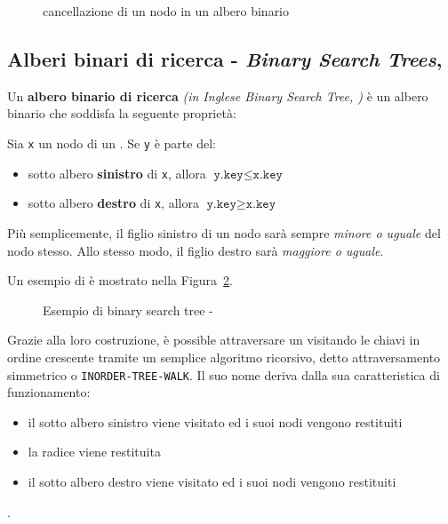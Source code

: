 \documentclass[italian, 10pt]{article}
\begin{document}
\begin{figure}[htbp]
  \bigskip
  \centering
  \caption{cancellazione di un nodo in un albero binario}
  \label{fig:cancellazione-albero-binario}
  \bigskip
\end{figure}

\subsection{Alberi binari di ricerca - \textit{Binary Search Trees}, \BST}

Un \textbf{albero binario di ricerca} \textit{(in Inglese Binary Search Tree, \BST)} è un albero binario che soddisfa la seguente proprietà:

Sia \texttt{x} un nodo di un \BST.
Se \texttt{y} è parte del:

\begin{itemize}
  \item sotto albero \textbf{sinistro} di \texttt{x}, allora \(\texttt{y.key} \leq \texttt{x.key}\)
  \item sotto albero \textbf{destro} di \texttt{x}, allora \(\texttt{y.key} \geq \texttt{x.key}\)
\end{itemize}

Più semplicemente, il figlio sinistro di un nodo sarà sempre \textit{minore o uguale} del nodo stesso.
Allo stesso modo, il figlio destro sarà \textit{maggiore o uguale}.

\bigskip
Un esempio di \BST è mostrato nella Figura~\ref{fig:esempio-bst}.

\begin{figure}[htbp]
  \bigskip
  \centering
  \caption{Esempio di binary search tree - \BST}
  \label{fig:esempio-bst}
  \bigskip
\end{figure}

\bigskip
Grazie alla loro costruzione, è possible attraversare un \BST visitando le chiavi in ordine crescente tramite un semplice algoritmo ricorsivo, detto attraversamento simmetrico o \texttt{INORDER-TREE-WALK}.
Il suo nome deriva dalla sua caratteristica di funzionamento:

\begin{itemize}
  \item il sotto albero sinistro viene visitato ed i suoi nodi vengono restituiti
  \item la radice viene restituita
  \item il sotto albero destro viene visitato ed i suoi nodi vengono restituiti
\end{itemize}.
\end{document}
